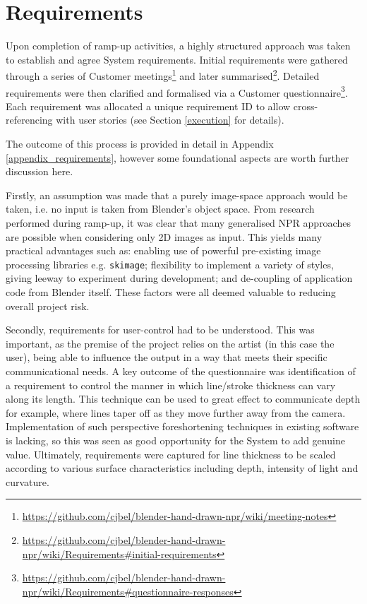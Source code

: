 \section{Requirements}

Upon completion of ramp-up activities, a highly structured approach was taken to establish and agree System requirements.
Initial requirements were gathered through a series of Customer meetings\footnote{\url{https://github.com/cjbel/blender-hand-drawn-npr/wiki/meeting-notes}} and later summarised\footnote{\url{https://github.com/cjbel/blender-hand-drawn-npr/wiki/Requirements#initial-requirements}}.
Detailed requirements were then clarified and formalised via a Customer questionnaire\footnote{\url{https://github.com/cjbel/blender-hand-drawn-npr/wiki/Requirements#questionnaire-responses}}. Each requirement was allocated a unique requirement ID to allow cross-referencing with user stories (see Section \ref{execution} for details).

The outcome of this process is provided in detail in Appendix \ref{appendix_requirements}, however some foundational aspects are worth further discussion here.

Firstly, an assumption was made that a purely image-space approach would be taken, i.e. no input is taken from Blender's object space.
From research performed during ramp-up, it was clear that many generalised NPR approaches are possible when considering only 2D images as input.
This yields many practical advantages such as: enabling use of powerful pre-existing image processing libraries e.g. \texttt{skimage}; flexibility to implement a variety of styles, giving leeway to experiment during development; and de-coupling of application code from Blender itself.
These factors were all deemed valuable to reducing overall project risk.

Secondly, requirements for user-control had to be understood.
This was important, as the premise of the project relies on the artist (in this case the user), being able to influence the output in a way that meets their specific communicational needs.
A key outcome of the questionnaire was identification of a requirement to control the manner in which line/stroke thickness can vary along its length.
This technique can be used to great effect to communicate depth for example, where lines taper off as they move further away from the camera.
Implementation of such perspective foreshortening techniques in existing software is lacking, so this was seen as good opportunity for the System to add genuine value.
Ultimately, requirements were captured for line thickness to be scaled according to various surface characteristics including depth, intensity of light and curvature.

